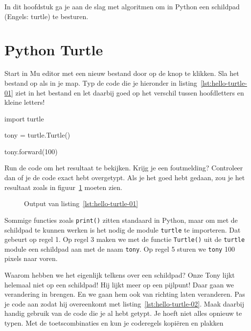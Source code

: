 \documentclass[../main]{subfiles}
\begin{document}
\vspace{\baselineskip}
In dit hoofdstuk ga je aan de slag met algoritmen om in Python een schildpad (Engels: turtle) te besturen.

\section{Python Turtle}
\label{sec:python_turtle}

Start in Mu editor met een nieuw bestand door op de knop  te klikken. Sla het bestand op als  in je  map. Typ de code die je hieronder in listing~\ref{lst:hello-turtle-01} ziet in het bestand en let daarbij goed op het verschil tussen hoofdletters en kleine letters!

\begin{python}[style=mu, caption={\file{hello\_turtle.py}}, label={lst:hello-turtle-01}]
import turtle

tony = turtle.Turtle()

tony.forward(100)
\end{python}

Run de code om het resultaat te bekijken. Krijg je een foutmelding? Controleer dan of je de code exact hebt overgetypt. Als je het goed hebt gedaan, zou je het resultaat zoals in figuur~\ref{fig:hello_turtle_01} moeten zien.

\begin{figure}[b]
    \centering
    \caption{Output van listing~\ref{lst:hello-turtle-01}}
    \label{fig:hello_turtle_01}
\end{figure}

Sommige functies zoals \texttt{print()} zitten standaard in Python, maar om met de schildpad te kunnen werken is het nodig de module \texttt{turtle} te importeren. Dat gebeurt op regel 1. Op regel 3 maken we met de functie \texttt{Turtle()} uit de \texttt{turtle} module een schildpad aan met de naam \texttt{tony}. Op regel 5 sturen we \texttt{tony} 100 pixels naar voren.

Waarom hebben we het eigenlijk telkens over een schildpad? Onze Tony lijkt helemaal niet op een schildpad! Hij lijkt meer op een pijlpunt! Daar gaan we verandering in brengen. En we gaan hem ook van richting laten veranderen. Pas je code aan zodat hij overeenkomt met listing~\ref{lst:hello-turtle-02}. Maak daarbij handig gebruik van de code die je al hebt getypt. Je hoeft niet alles opnieuw te typen. Met de toetscombinaties  en  kun je coderegels kopiëren en plakken
\end{document}
